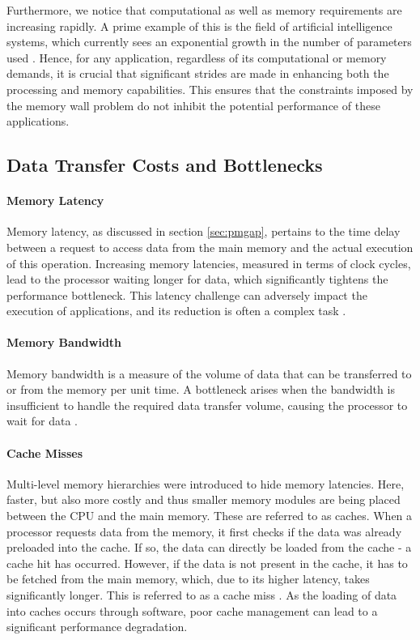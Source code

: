 Furthermore, we notice that computational as well as memory requirements are increasing rapidly. A prime example of this is the field of artificial intelligence systems, which currently sees an exponential growth in the number of parameters used \cite{ourworldindata2023ai}. Hence, for any application, regardless of its computational or memory demands, it is crucial that significant strides are made in enhancing both the processing and memory capabilities. This ensures that the constraints imposed by the memory wall problem do not inhibit the potential performance of these applications.

\subsection{Data Transfer Costs and Bottlenecks}\label{sec:data_transfer}
\paragraph*{Memory Latency} Memory latency, as discussed in section \ref{sec:pmgap}, pertains to the time delay between a request to access data from the main memory and the actual execution of this operation. Increasing memory latencies, measured in terms of clock cycles, lead to the processor waiting longer for data, which significantly tightens the performance bottleneck. This latency challenge can adversely impact the execution of applications, and its reduction is often a complex task \cite{machanick2002approaches}.
\paragraph*{Memory Bandwidth} Memory bandwidth is a measure of the volume of data that can be transferred to or from the memory per unit time. A bottleneck arises when the bandwidth is insufficient to handle the required data transfer volume, causing the processor to wait for data \cite{machanick2002approaches}.
\paragraph*{Cache Misses} Multi-level memory hierarchies were introduced to hide memory latencies. Here, faster, but also more costly and thus smaller memory modules are being placed between the CPU and the main memory. These are referred to as caches. When a processor requests data from the memory, it first checks if the data was already preloaded into the cache. If so, the data can directly be loaded from the cache - a cache hit has occurred. However, if the data is not present in the cache, it has to be fetched from the main memory, which, due to its higher latency, takes significantly longer. This is referred to as a cache miss \cite{efnusheva2017survey, mahapatra1999processor, machanick2002approaches}. As the loading of data into caches occurs through software, poor cache management can lead to a significant performance degradation.

